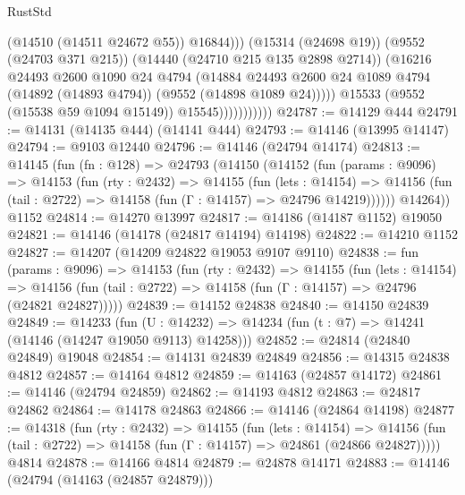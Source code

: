 \begin{lexlean}{RustStd}
\begin{coremodule}
                                  (@14510 (@14511 @24672 @55))
                                  @16844)))
                            (@15314 (@24698 @19))
                            (@9552 (@24703 @371 @215))
                            (@14440 (@24710 @215 @135 @2898 @2714))
                            (@16216
                              @24493
                              @2600
                              @1090
                              @24
                              @4794
                              (@14884
                                @24493
                                @2600
                                @24
                                @1089
                                @4794
                                (@14892 (@14893 @4794))
                                (@9552 (@14898 @1089 @24)))))
                          @15533
                          (@9552 (@15538 @59 @1094 @15149))
                          @15545)))))))))))
@24787 := @14129 @444
@24791 := @14131 (@14135 @444) (@14141 @444)
@24793 := @14146 (@13995 @14147)
@24794 := @9103 @12440
@24796 := @14146 (@24794 @14174)
@24813 := @14145
    (fun (fn : @128) =>
    @24793
      (@14150
        (@14152
          (fun (params : @9096) =>
          @14153
            (fun (rty : @2432) =>
            @14155
              (fun (lets : @14154) =>
              @14156 (fun (tail : @2722) => @14158 (fun (Γ : @14157) => @24796 @14219))))))
        @14264))
    @1152
@24814 := @14270 @13997
@24817 := @14186 (@14187 @1152) @19050
@24821 := @14146 (@14178 (@24817 @14194) @14198)
@24822 := @14210 @1152
@24827 := @14207 (@14209 @24822 @19053 @9107 @9110)
@24838 := fun (params : @9096) =>
  @14153
    (fun (rty : @2432) =>
    @14155
      (fun (lets : @14154) =>
      @14156 (fun (tail : @2722) => @14158 (fun (Γ : @14157) => @24796 (@24821 @24827)))))
@24839 := @14152 @24838
@24840 := @14150 @24839
@24849 := @14233
    (fun (U : @14232) => @14234 (fun (t : @7) => @14241 (@14146 (@14247 @19050 @9113) @14258)))
@24852 := @24814 (@24840 @24849) @19048
@24854 := @14131 @24839 @24849
@24856 := @14315 @24838 @4812
@24857 := @14164 @4812
@24859 := @14163 (@24857 @14172)
@24861 := @14146 (@24794 @24859)
@24862 := @14193 @4812
@24863 := @24817 @24862
@24864 := @14178 @24863
@24866 := @14146 (@24864 @14198)
@24877 := @14318
    (fun (rty : @2432) =>
    @14155
      (fun (lets : @14154) =>
      @14156 (fun (tail : @2722) => @14158 (fun (Γ : @14157) => @24861 (@24866 @24827)))))
    @4814
@24878 := @14166 @4814
@24879 := @24878 @14171
@24883 := @14146 (@24794 (@14163 (@24857 @24879)))

\end{coremodule}
\end{lexlean}
